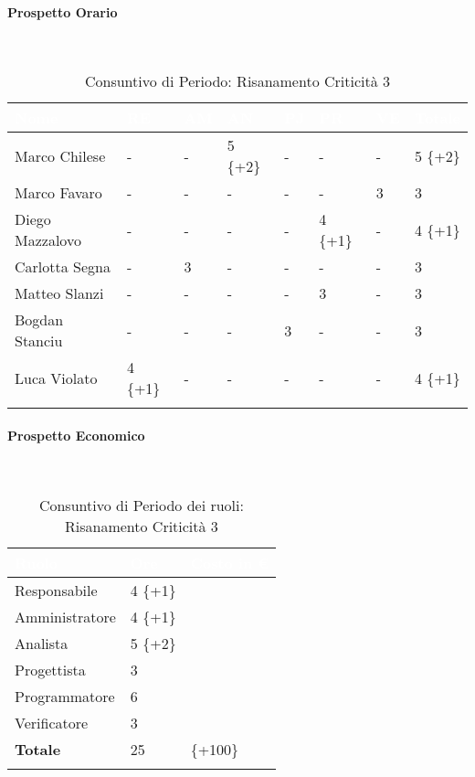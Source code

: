 \paragraph{Prospetto Orario} \-\\
\begin{longtable}{|C{.30\textwidth}|C{.06\textwidth}|C{.06\textwidth}|C{.06\textwidth} | C{.06\textwidth}| C{.06\textwidth} | C{.06\textwidth} | C{.10\textwidth} |}
	\hline
		\textbf{\textcolor{white}{Nome}} & \textbf{\textcolor{white}{RE}} & \textbf{\textcolor{white}{AM}} & \textbf{\textcolor{white}{AN}} & \textbf{\textcolor{white}{PJ}} & \textbf{\textcolor{white}{PR}} & \textbf{\textcolor{white}{VE}} & \textbf{\textcolor{white}{Totale}}\\
	\hline \hline
	
	Marco Chilese & - & - & 5 \{+2\} & - & - & - & 5 \{+2\}\\
	\hline
	Marco Favaro & - & - & - & - & - & 3 & 3 \\
	\hline
	Diego Mazzalovo & - & - & - & - & 4 \{+1\} & - & 4 \{+1\}\\
	\hline
	Carlotta Segna & - & 3 & - & - & - & - & 3\\
	\hline
	Matteo Slanzi & - & - & - & - & 3 & - & 3\\
	\hline
	Bogdan Stanciu & - & - & - & 3 & - & - & 3 \\
	\hline
	Luca Violato & 4 \{+1\} & - & - & - & - & - & 4 \{+1\}\\
	\hline
	\caption{Consuntivo di Periodo: Risanamento Criticità 3}
	\label{Distribuzione oraria del periodo di rc3}
\end{longtable}

\paragraph{Prospetto Economico} \-\\

\begin{longtable}{| C{.30\textwidth}| C{.15\textwidth}| C{.20\textwidth}|}
	\hline
	\textbf{\textcolor{white}{Ruolo}} & \textbf{\textcolor{white}{Ore}} & \textbf{\textcolor{white}{Costo 	in \euro}} \\
	\hline 
	Responsabile & 4 \{+1\}&  \\
	\hline
	Amministratore & 4 \{+1\} &  \\
	\hline
	Analista & 5 \{+2\}&  \\
	\hline
	Progettista & 3 & \\
	\hline
	Programmatore & 6&  \\
	\hline 
	Verificatore & 3 &  \\
	\hline
	\textbf{Totale} & 25 &  \{+100\} \\
	\hline 
	
	\caption{Consuntivo di Periodo dei ruoli: Risanamento Criticità 3}
	\label{Distribuzione ruoli RC3}
\end{longtable}

